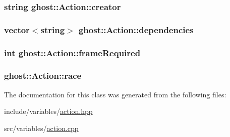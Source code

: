 \hypertarget{classghost_1_1Action_ab4862cbb4a415783306abbd1a2c57472}{
\subsubsection[{creator}]{\setlength{\rightskip}{0pt plus 5cm}string ghost\-::\-Action\-::creator\hspace{0.3cm}{\ttfamily [private]}}}\label{classghost_1_1Action_ab4862cbb4a415783306abbd1a2c57472}
\hypertarget{classghost_1_1Action_a0e7e5f84cc8d24bed8d83021602b02c2}{
\subsubsection[{dependencies}]{\setlength{\rightskip}{0pt plus 5cm}vector$<$string$>$ ghost\-::\-Action\-::dependencies\hspace{0.3cm}{\ttfamily [private]}}}\label{classghost_1_1Action_a0e7e5f84cc8d24bed8d83021602b02c2}
\hypertarget{classghost_1_1Action_a9b440d6806597b8f87f342a03fcaa39f}{
\subsubsection[{frame\-Required}]{\setlength{\rightskip}{0pt plus 5cm}int ghost\-::\-Action\-::frame\-Required\hspace{0.3cm}{\ttfamily [private]}}}\label{classghost_1_1Action_a9b440d6806597b8f87f342a03fcaa39f}
\hypertarget{classghost_1_1Action_a040eaa1d69dc99221cbdf48d84ce6edb}{
\subsubsection[{race}]{ ghost\-::\-Action\-::race\hspace{0.3cm}{\ttfamily [private]}}}\label{classghost_1_1Action_a040eaa1d69dc99221cbdf48d84ce6edb}


The documentation for this class was generated from the following files\-:\begin{DoxyCompactItemize}
\item 
include/variables/\hyperlink{action_8hpp}{action.\-hpp}\item 
src/variables/\hyperlink{action_8cpp}{action.\-cpp}\end{DoxyCompactItemize}
